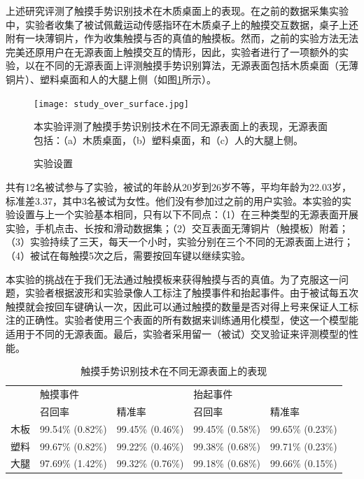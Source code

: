 上述研究评测了触摸手势识别技术在木质桌面上的表现。在之前的数据采集实验中，实验者收集了被试佩戴运动传感指环在木质桌子上的触摸交互数据，桌子上还附有一块薄铜片，作为收集触摸与否的真值的触摸板。然而，之前的实验方法无法完美还原用户在无源表面上触摸交互的情形，因此，实验者进行了一项额外的实验，以在不同的无源表面上评测触摸手势识别算法，无源表面包括木质桌面（无薄铜片）、塑料桌面和人的大腿上侧（如图\ref{fig:study_over_surface}所示）。

\begin{figure}
	\centering
	\texttt{[image: study\_over\_surface.jpg]}
	\caption*{本实验评测了触摸手势识别技术在不同无源表面上的表现，无源表面包括：（a）木质桌面，（b）塑料桌面，和（c）人的大腿上侧。}
	\caption{实验设置}
	\label{fig:study_over_surface}
\end{figure}

共有12名被试参与了实验，被试的年龄从20岁到26岁不等，平均年龄为22.03岁，标准差3.37，其中3名被试为女性。他们没有参加过之前的用户实验。本实验的实验设置与上一个实验基本相同，只有以下不同点：（1）在三种类型的无源表面开展实验，手机点击、长按和滑动数据集；（2）交互表面无薄铜片（触摸板）附着；（3）实验持续了三天，每天一个小时，实验分别在三个不同的无源表面上进行；（4）被试在每触摸5次之后，需要按回车键以继续实验。

本实验的挑战在于我们无法通过触摸板来获得触摸与否的真值。为了克服这一问题，实验者根据波形和实验录像人工标注了触摸事件和抬起事件。由于被试每五次触摸就会按回车键确认一次，因此可以通过触摸的数量是否对得上号来保证人工标注的正确性。实验者使用三个表面的所有数据来训练通用化模型，使这一个模型能适用于不同的无源表面。最后，实验者采用留一（被试）交叉验证来评测模型的性能。

\begin{table}[!htbp]
	\centering
	\begin{tabular}{l|ll|ll}
		\toprule
		& 触摸事件     &                 & 抬起事件 &     \\ \cline{2-5} 
		& 召回率     & 精准率       & 召回率     & 精准率       \\ \hline
		木板    & 99.54\% (0.82\%) & 99.45\% (0.46\%) & 99.45\% (0.58\%) & 99.65\% (0.23\%) \\
		塑料 & 99.67\% (0.82\%) & 99.22\% (0.46\%) & 99.38\% (0.68\%) & 99.71\% (0.23\%) \\
		大腿 & 97.69\% (1.42\%) & 99.32\% (0.76\%) & 99.18\% (0.68\%) & 99.66\% (0.15\%)\\
		\bottomrule
	\end{tabular}
	\caption{触摸手势识别技术在不同无源表面上的表现}
	\label{tab:touch_over_surface}
\end{table}

